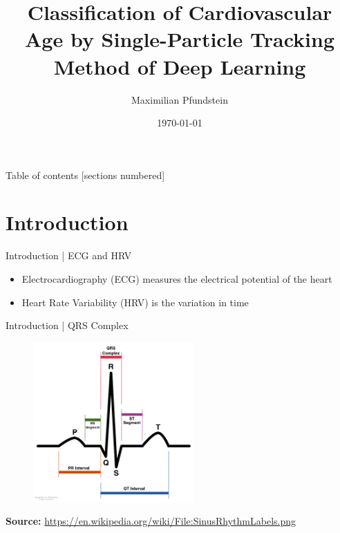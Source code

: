 \documentclass{beamer}
\title{Classification of Cardiovascular Age by Single-Particle Tracking Method of Deep Learning}
\date{\today}
\author{Maximilian Pfundstein}
\institute{Linköpings University}
\begin{document}
    \maketitle
    
    \begin{frame}{Table of contents}
      [sections numbered]
      \tableofcontents%
    \end{frame}
    
    \section{Introduction}
    \begin{frame}{Introduction | ECG and HRV}
        \begin{itemize}
            \item Electrocardiography (ECG) measures the electrical potential of the heart
            \item Heart Rate Variability (HRV) is the variation in time
        \end{itemize}
    \end{frame}
    
    \begin{frame}{Introduction | QRS Complex}
        \begin{figure}[hbt]
        	\center
        	\includegraphics[width=0.55\textwidth]{img/QRS.png}
 
        	\label{fig:qrs}
        \end{figure}
        \textbf{Source:} \url{https://en.wikipedia.org/wiki/File:SinusRhythmLabels.png}
    \end{frame}
    
\end{document}
